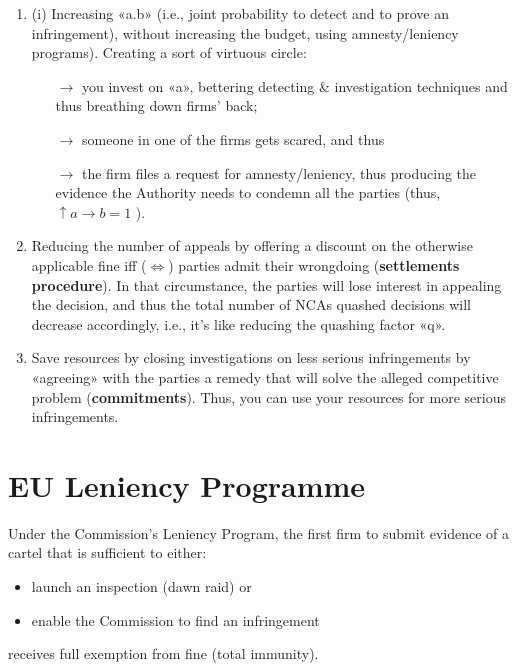             \begin{enumerate}
                \item (i) Increasing «a.b» (i.e., joint probability to detect and to prove an infringement), without increasing the budget, using amnesty/leniency programs). Creating a sort of virtuous circle: 
                \begin{itemize}
                    \item[\(\rightarrow\)] you invest on «a», bettering detecting \& investigation techniques and thus breathing down firms’ back; 
                    \item[\(\rightarrow\)] someone in one of the firms gets scared, and thus
                    \item[\(\rightarrow\)]the firm files a request for amnesty/leniency, thus producing the evidence the Authority needs to condemn all the parties (thus, $\uparrow a \rightarrow b= 1$ ).
                \end{itemize}
                \item Reducing the number of appeals by offering a discount on the otherwise applicable fine iff (\(\iff\)) parties admit their wrongdoing (\textbf{settlements procedure}). In that circumstance, the parties will lose interest in appealing the decision, and thus the total number of NCAs quashed decisions will decrease accordingly, i.e., it’s like reducing the quashing factor «q».
                \item Save resources by closing investigations on less serious infringements by «agreeing» with the parties a remedy that will solve the alleged competitive problem (\textbf{commitments}). Thus, you can use your resources for more serious infringements.
            \end{enumerate}

\section{EU Leniency Programme}

    Under the Commission's Leniency Program, the first firm to submit evidence of a cartel that is sufficient to either:
        \begin{itemize}
            \item launch an inspection (dawn raid) or
            \item enable the Commission to find an infringement
        \end{itemize}
    receives full exemption from fine (total immunity).
    
